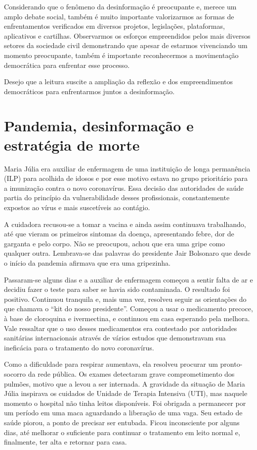 Considerando que o fenômeno da desinformação é preocupante e, merece um
amplo debate social, também é muito importante valorizarmos as formas de
enfrentamentos verificados em diversos projetos, legislações,
plataformas, aplicativos e cartilhas. Observarmos os esforços
empreendidos pelos mais diversos setores da sociedade civil demonstrando
que apesar de estarmos vivenciando um momento preocupante, também é
importante reconhecermos a movimentação democrática para enfrentar esse
processo.

Desejo que a leitura suscite a ampliação da reflexão e dos
empreendimentos democráticos para enfrentarmos juntos a desinformação.

\chapter{Pandemia, desinformação e estratégia de morte}

Maria Júlia era auxiliar de enfermagem de uma instituição de longa
permanência (ILP) para acolhida de idosos e por esse motivo estava no
grupo prioritário para a imunização contra o novo coronavírus. Essa
decisão das autoridades de saúde partia do princípio da vulnerabilidade
desses profissionais, constantemente expostos ao vírus e mais
suscetíveis ao contágio.

A cuidadora recusou-se a tomar a vacina e ainda assim continuava
trabalhando, até que vieram os primeiros sintomas da doença,
apresentando febre, dor de garganta e pelo corpo. Não se preocupou,
achou que era uma gripe como qualquer outra. Lembrava-se das palavras do
presidente Jair Bolsonaro que desde o início da pandemia afirmava que
era uma gripezinha.

Passaram-se alguns dias e a auxiliar de enfermagem começou a sentir
falta de ar e decidiu fazer o teste para saber se havia sido
contaminada. O resultado foi positivo. Continuou tranquila e, mais uma
vez, resolveu seguir as orientações do que chamava o ``kit do nosso
presidente''. Começou a usar o medicamento precoce, à base de cloroquina
e ivermectina, e continuou em casa esperando pela melhora. Vale
ressaltar que o uso desses medicamentos era contestado por autoridades
sanitárias internacionais através de vários estudos que demonstravam sua
ineficácia para o tratamento do novo coronavírus.

Como a dificuldade para respirar aumentava, ela resolveu procurar um
pronto-socorro da rede pública. Os exames detectaram grave
comprometimento dos pulmões, motivo que a levou a ser internada. A
gravidade da situação de Maria Júlia inspirava os cuidados de Unidade de
Terapia Intensiva (UTI), mas naquele momento o hospital não tinha leitos
disponíveis. Foi obrigada a permanecer por um período em uma maca
aguardando a liberação de uma vaga. Seu estado de saúde piorou, a ponto
de precisar ser entubada. Ficou inconsciente por alguns dias, até
melhorar o suficiente para continuar o tratamento em leito normal e,
finalmente, ter alta e retornar para casa.

